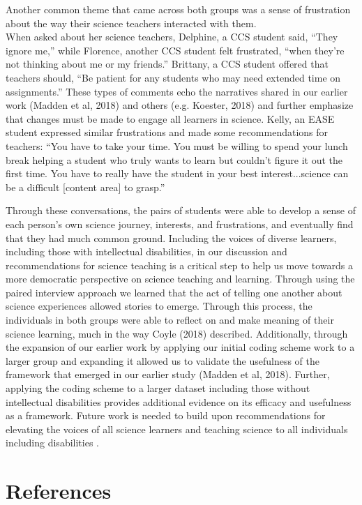 \documentclass[11pt]{sig-alternate}
\begin{document}
\begin{large}
Another common theme that came across both groups was a sense of frustration about the way their science teachers interacted with them. \\When asked about her science teachers, Delphine, a CCS student said, “They ignore me,” while Florence, another CCS student felt frustrated, “when they’re not thinking about me or my friends.” Brittany, a CCS student offered that teachers should, “Be patient for any students who may need extended time on assignments.” These types of comments echo the narratives shared in our earlier work (Madden et al, 2018) and others (e.g. Koester, 2018) and further emphasize that changes must be made to engage all learners in science. Kelly, an EASE student expressed similar frustrations and made some recommendations for teachers: “You have to take your time. You must be willing to spend your lunch break helping a student who truly wants to learn but couldn't figure it out the first time. You have to really have the student in your best interest...science can be a difficult [content area] to grasp.” 

Through these conversations, the pairs of students were able to develop a sense of each person’s own science journey, interests, and frustrations, and eventually find that they had much common ground. Including the voices of diverse learners, including those with intellectual disabilities, in our discussion and recommendations for science teaching is a critical step to help us move towards a more democratic perspective on science teaching and learning. Through using the paired interview approach we learned that the act of telling one another about science experiences allowed stories to em\-erge. Through this process, the individuals in both groups were able to reflect on and make meaning of their science learning, much in the way Coyle (2018) described. Additionally, thro\-ugh the expansion of our earlier work by applying our initial coding scheme work to a larger group and expanding it allowed us to validate the usefulness of the framework that emerged in our earlier study (Madden et al, 2018). Further, applying the coding scheme to a larger dataset including those without intellectual disabilities provides additional evidence on its efficacy and usefulness as a framework. Future work is needed to build upon recommendations for elevating the voices of all science learners and teaching science to all individuals including disabilities . 

 
\section*{References}\par 


\end{large}
\end{document}
